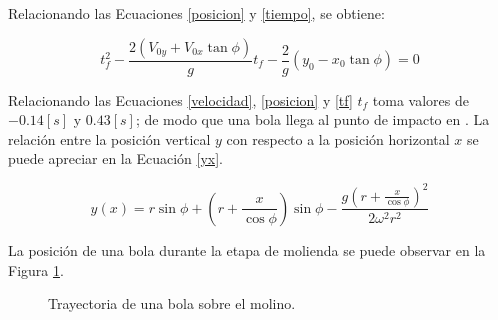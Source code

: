 Relacionando las Ecuaciones \ref{posicion} y \ref{tiempo}, se obtiene:

\begin{equation}
t_f ^2 - \frac{2 \left(V_{0y} + V_{0x} \tan \phi \right)}{g} t_f - \frac{2}{g} \left( y_0 - x_0 \tan \phi \right) = 0
\label{tf}
\end{equation}

\noindent
\justify

Relacionando las Ecuaciones \ref{velocidad}, \ref{posicion} y \ref{tf} $t_f$ toma valores de $-0.14 [s]$ y $0.43 [s]$; de modo que una bola llega al punto de impacto en \textbf{}. La relaci\'on entre la posici\'on vertical $y$ con respecto a la posici\'on horizontal $x$ se puede apreciar en la Ecuaci\'on \ref{yx}.

\begin{equation}
y (x) = r \sin \phi + \left(r + \frac{x}{\cos \phi} \right) \sin \phi - \frac{g \left(r + \frac{x}{\cos \phi} \right) ^2}{2 \omega ^2 r^2}
\label{yx}
\end{equation}

\noindent
\justify

La posici\'on de una bola durante la etapa de molienda se puede observar en la Figura \ref{yxgraph}.

\begin{figure}[h!]
\centering
{}
\caption{Trayectoria de una bola sobre el molino.}
\label{yxgraph}
\end{figure}